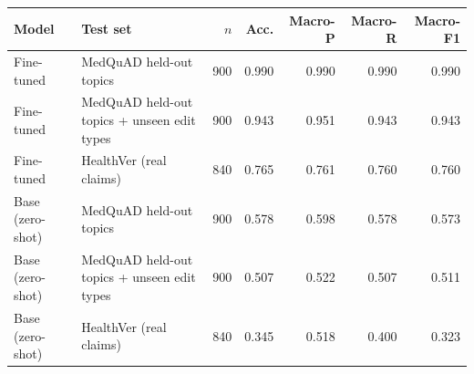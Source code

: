 \begin{tabular}{llrrrrr}
\toprule
Model & Test set & $n$ & Acc. & Macro-P & Macro-R & Macro-F1 \\
\midrule
Fine-tuned & MedQuAD held-out topics & 900 & 0.990 & 0.990 & 0.990 & 0.990 \\
Fine-tuned & MedQuAD held-out topics + unseen edit types & 900 & 0.943 & 0.951 & 0.943 & 0.943 \\
Fine-tuned & HealthVer (real claims) & 840 & 0.765 & 0.761 & 0.760 & 0.760 \\
Base (zero-shot) & MedQuAD held-out topics & 900 & 0.578 & 0.598 & 0.578 & 0.573 \\
Base (zero-shot) & MedQuAD held-out topics + unseen edit types & 900 & 0.507 & 0.522 & 0.507 & 0.511 \\
Base (zero-shot) & HealthVer (real claims) & 840 & 0.345 & 0.518 & 0.400 & 0.323 \\
\bottomrule
\end{tabular}